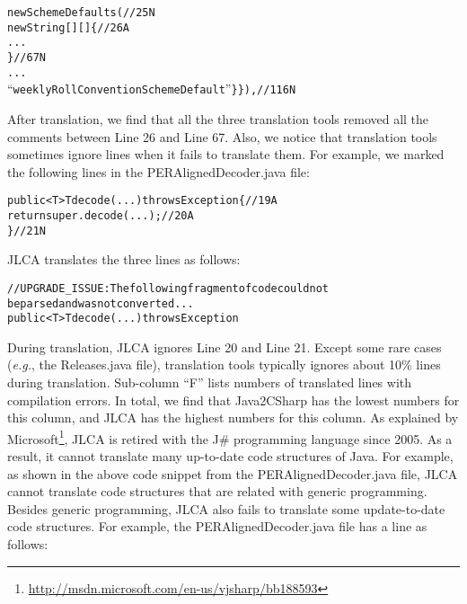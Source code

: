 \begin{CodeOut}%
\begin{alltt}
new SchemeDefaults (//25N
  new String [][] \{//26A
  ...
  \}//67N
  ...
``weeklyRollConventionSchemeDefault'' \} \}),//116N
\end{alltt}
\end{CodeOut}

After translation, we find that all the three translation tools removed all the comments between Line 26 and Line 67. Also, we notice that translation tools sometimes ignore lines when it fails to translate them. For example, we marked the following lines in the PERAlignedDecoder.java file:

\begin{CodeOut}%
\begin{alltt}
public <T> T decode(...) throws Exception \{//19A
  return super.decode(...);//20A
\}//21N
\end{alltt}
\end{CodeOut}

JLCA translates the three lines as follows:
\begin{CodeOut}%
\begin{alltt}
//UPGRADE_ISSUE: The following fragment of code could not
   be parsed and was not converted...
public < T > T decode(...) throws Exception
\end{alltt}
\end{CodeOut}

During translation, JLCA ignores Line 20 and Line 21. Except some rare cases (\emph{e.g.}, the Releases.java file), translation tools typically ignores about 10\% lines during translation. Sub-column ``F'' lists numbers of translated lines with compilation errors. In total, we find that Java2CSharp has the lowest numbers for this column, and JLCA has the highest numbers for this column. As explained by Microsoft\footnote{\url{http://msdn.microsoft.com/en-us/vjsharp/bb188593}}, JLCA is retired with the J\# programming language since 2005. As a result, it cannot translate many up-to-date code structures of Java. For example, as shown in the above code snippet from the PERAlignedDecoder.java file, JLCA cannot translate code structures that are related with generic programming. Besides generic programming, JLCA also fails to translate some update-to-date code structures. For example, the PERAlignedDecoder.java file has a line as follows:

